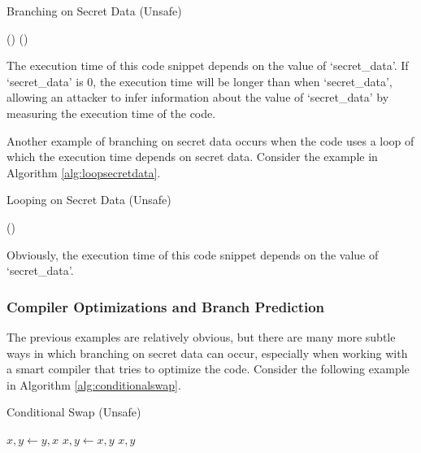 \documentclass[11pt,a4paper]{report}
\theoremstyle{definition}
\begin{document}
\begin{algorithm}
  \caption{Branching on Secret Data (Unsafe)}
  \label{alg:branchingsecretdata}
  \begin{algorithmic}[1]
      \State {}() 
    \Else
      \State {}() 
    \EndIf
  \end{algorithmic}
\end{algorithm}

The execution time of this code snippet depends on the value of `secret\_data'. If `secret\_data' is 0, the execution time will be longer than when `secret\_data', allowing an attacker to infer information about the value of `secret\_data' by measuring the execution time of the code.

Another example of branching on secret data occurs when the code uses a loop of which the execution time depends on secret data. Consider the example in Algorithm \ref{alg:loopsecretdata}.

\begin{algorithm}
  \caption{Looping on Secret Data (Unsafe)}
  \label{alg:loopsecretdata}
  \begin{algorithmic}[1]
      \State {}()
    \EndFor
  \end{algorithmic}
\end{algorithm}

Obviously, the execution time of this code snippet depends on the value of `secret\_data'.

\subsubsection{Compiler Optimizations and Branch Prediction}
The previous examples are relatively obvious, but there are many more subtle ways in which branching on secret data can occur, especially when working with a smart compiler that tries to optimize the code. Consider the following example in Algorithm \ref{alg:conditionalswap}.

\begin{algorithm}
  \caption{Conditional Swap (Unsafe)}
  \label{alg:conditionalswap}
  \begin{algorithmic}[1]
        \State $x, y \gets y, x$
      \Else
        \State $x, y \gets x, y$
      \EndIf
      \State \Return $x, y$
    \EndFunction
  \end{algorithmic}
\end{algorithm}
\end{document}
